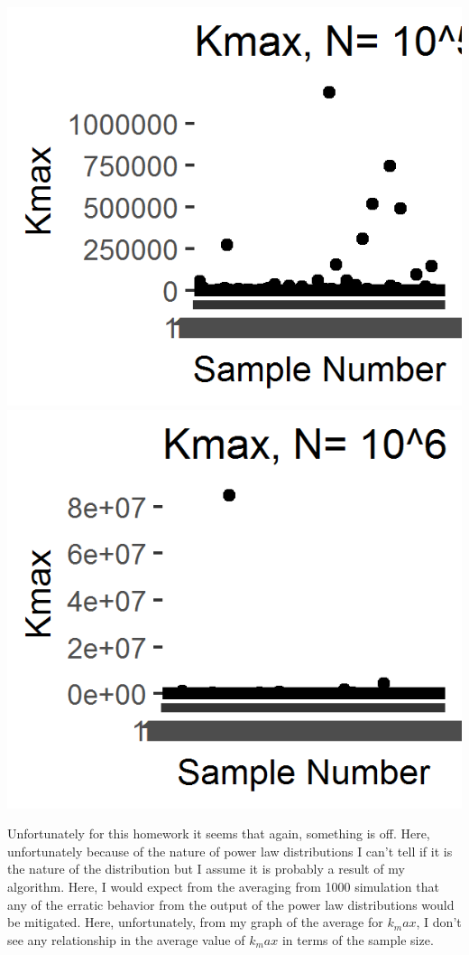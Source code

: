 \includegraphics{../images/Problem6_10^5.png}
\includegraphics{../images/Problem6_10^6.png}

Unfortunately for this homework it seems that again, something is off. Here, unfortunately because of the nature of power law distributions I can't tell if it is the nature of the distribution but I assume it is probably a result of my algorithm. Here, I would expect from the averaging from 1000 simulation that any of the erratic behavior from the output of the power law distributions would be mitigated. Here, unfortunately, from my graph of the average for $k_max$, I don't see any relationship in the average value of $k_max$ in terms of the sample size.


